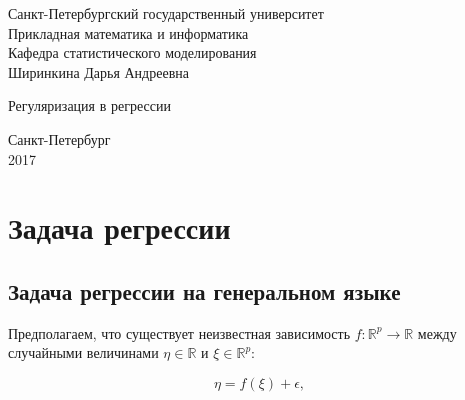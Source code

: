 \documentclass[specialist,
               subf,href,colorlinks=true, 12pt,a4paper]{article} %
\newcommand{\R}{\mathbb{R}}
\numberwithin{equation}{section}
\begin{document}
%







	\thispagestyle{empty}
%
	\begin{center}
		Санкт-Петербургский государственный университет \\
		\vspace{0.3cm}	
		Прикладная математика и информатика \\
		\vspace{0.3cm}
		Кафедра статистического моделирования \\
		
		\vspace{8cm}		
			Ширинкина Дарья Андреевна \\
		{\large 
		   	
			
			\vspace{0.3cm}	
			\Large Регуляризация в регрессии \\
			\vspace{12cm}	

		}
		Санкт-Петербург \\
				2017
	\end{center}
	
\newpage


\tableofcontents
\newpage

\section{Задача регрессии}
\subsection{Задача регрессии на генеральном языке}

Предполагаем, что существует неизвестная зависимость $f: \R^p \rightarrow \R$ между случайными величинами $\eta \in \R$ и $\xi \in \R^p$:

\begin{equation*}
\eta = f(\xi) + \epsilon,
\end{equation*}
\end{document}

